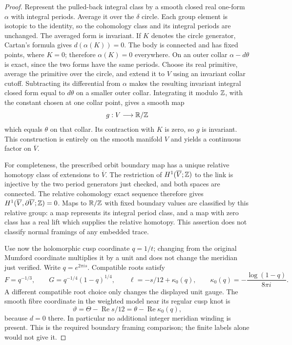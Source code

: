 \begin{proof}
Represent the pulled-back integral class by a smooth closed real
one-form $\alpha$ with integral periods. Average it over the
$\delta$ circle. Each group element is isotopic to the identity,
so the cohomology class and its integral periods are unchanged.
The averaged form is invariant. If $K$ denotes the circle
generator, Cartan's formula gives $d(\alpha(K))=0$.
The body is connected and has fixed points, where $K=0$;
therefore $\alpha(K)=0$ everywhere.
On an outer collar $\alpha-d\theta$ is exact, since the two
forms have the same periods. Choose its real primitive,
average the primitive over the circle, and extend it to $V$
using an invariant collar cutoff. Subtracting its differential
from $\alpha$ makes the resulting invariant integral closed
form equal to $d\theta$ on a smaller outer collar. Integrating
it modulo $\mathbb Z$, with the constant chosen at one collar point,
gives a smooth map
\[
 g:V\longrightarrow\mathbb R/\mathbb Z
\]
which equals $\theta$ on that collar. Its contraction with $K$
is zero, so $g$ is invariant. This construction is entirely on
the smooth manifold $V$ and yields a continuous factor on
$\overline V$.

For completeness, the prescribed orbit boundary map has a
unique relative homotopy class of extensions to $\overline V$.
The restriction of $H^1(\overline V;\mathbb Z)$ to the link is
injective by the two period generators just checked, and both
spaces are connected. The relative cohomology exact sequence
therefore gives $H^1(\overline V,\partial\overline V;\mathbb Z)=0$.
Maps to $\mathbb R/\mathbb Z$ with fixed boundary values are classified by
this relative group: a map represents its integral period class,
and a map with zero class has a real lift which supplies the
relative homotopy. This assertion does not classify normal
framings of any embedded trace.

Use now the holomorphic cusp coordinate $q=1/t$; changing from
the original Mumford coordinate multiplies it by a unit and
does not change the meridian just verified. Write
$q=e^{2\pi i s}$. Compatible roots satisfy
\[
 F=q^{-1/3},\qquad G=q^{-1/4}(1-q)^{1/4},\qquad
 \ell=-s/12+\kappa_0(q),\qquad
 \kappa_0(q)=-\frac{\log(1-q)}{8\pi i}.
\]
A different compatible root choice only changes the displayed
unit gauge. The smooth fibre coordinate in the weighted model
near its regular cusp knot is
\begin{equation}\label{eq:C13-cusp-gauge}
 \vartheta=\Theta-\operatorname{Re}s/12
           =\theta-\operatorname{Re}\kappa_0(q),
\end{equation}
because $d=0$ there. In particular no additional integer
meridian winding is present. This is the required boundary
framing comparison; the finite labels alone would not give it.


\end{proof}

